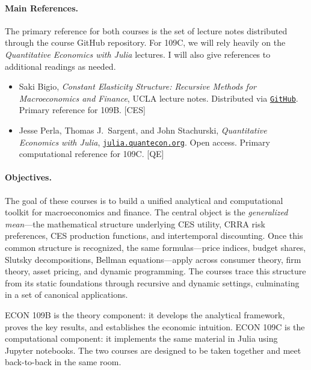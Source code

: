 \paragraph{Main References.}
The primary reference for both courses is the set of lecture notes distributed through the course GitHub repository.
For 109C, we will rely heavily on the \textit{Quantitative Economics with Julia} lectures.
I will also give references to additional readings as needed.
\begin{itemize}
    \item Saki Bigio, \textit{Constant Elasticity Structure: Recursive Methods for Macroeconomics and Finance}, UCLA lecture notes. Distributed via \href{https://github.com/sakibigio/CES-Lecture-Notes}{\texttt{GitHub}}. Primary reference for 109B. [CES]
    \item Jesse Perla, Thomas J.\ Sargent, and John Stachurski, \textit{Quantitative Economics with Julia}, \href{https://julia.quantecon.org}{\texttt{julia.quantecon.org}}. Open access. Primary computational reference for 109C. [QE]
\end{itemize}

\paragraph{Objectives.}
The goal of these courses is to build a unified analytical and computational toolkit for macroeconomics and finance.
The central object is the \emph{generalized mean}---the mathematical structure underlying CES utility, CRRA risk preferences, CES production functions, and intertemporal discounting.
Once this common structure is recognized, the same formulas---price indices, budget shares, Slutsky decompositions, Bellman equations---apply across consumer theory, firm theory, asset pricing, and dynamic programming.
The courses trace this structure from its static foundations through recursive and dynamic settings, culminating in a set of canonical applications.

ECON 109B is the theory component: it develops the analytical framework, proves the key results, and establishes the economic intuition.
ECON 109C is the computational component: it implements the same material in Julia using Jupyter notebooks.
The two courses are designed to be taken together and meet back-to-back in the same room.

